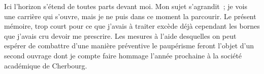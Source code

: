 \documentclass[french,twoside]{book} %
\newif\ifdev
\renewcommand{\LettrineFontHook}{\color{rubric}}
\newcommand{\initialiv}[2]{%
  \let\oldLFH\LettrineFontHook
  \IfSubStr{QJ’}{#1}{
    \lettrine[lines=4, lhang=0.2, loversize=-0.1, lraise=0.2]{\smash{#1}}{#2}
  }{\IfSubStr{É}{#1}{
    \lettrine[lines=4, lhang=0.2, loversize=-0, lraise=0]{\smash{#1}}{#2}
  }{\IfSubStr{ÀÂ}{#1}{
    \lettrine[lines=4, lhang=0.2, loversize=-0, lraise=0, slope=0.6em]{\smash{#1}}{#2}
  }{\IfSubStr{A}{#1}{
    \lettrine[lines=4, lhang=0.2, loversize=0.2, slope=0.6em]{\smash{#1}}{#2}
  }{\IfSubStr{V}{#1}{
    \lettrine[lines=4, lhang=0.2, loversize=0.2, slope=-0.5em]{\smash{#1}}{#2}
  }{
    \lettrine[lines=4, lhang=0.2, loversize=0.2]{\smash{#1}}{#2}
  }}}}}
  \let\LettrineFontHook\oldLFH
}
\renewcommand{\LettrineFontHook}{\bfseries\color{rubric}}
\begin{document}
Ici l’horizon s’étend de toutes parts devant moi. Mon sujet s’agrandit ; je vois une carrière qui s’ouvre, mais je ne puis dans ce moment la parcourir. Le présent mémoire, trop court pour ce que j’avais à traiter excède déjà cependant les bornes que j’avais cru devoir me prescrire. Les mesures à l’aide desquelles on peut espérer de combattre d’une manière préventive le paupérisme feront l’objet d’un second ouvrage dont je compte faire hommage l’année prochaine à la société académique de Cherbourg.
 


\ifbooklet
  \newpage\null\thispagestyle{empty}\newpage
\fi

\ifdev %
\fontname\font — \textsc{Les règles du jeu}\par
(\hyperref[utopie]{\underline{Lien}})\par
\noindent \initialiv{A}{lors là}\blindtext\par
\noindent \initialiv{À}{ la bonheur des dames}\blindtext\par
\noindent \initialiv{É}{tonnez-le}\blindtext\par
\noindent \initialiv{Q}{ualitativement}\blindtext\par
\noindent \initialiv{V}{aloriser}\blindtext\par
\Blindtext
\phantomsection
\label{utopie}
\Blinddocument
\fi
\end{document}
